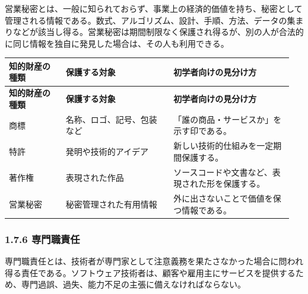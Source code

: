 \documentclass[uplatex,dvipdfmx,a4paper,11pt]{jsarticle}
\begin{document}
営業秘密とは、一般に知られておらず、事業上の経済的価値を持ち、秘密として管理される情報である。数式、アルゴリズム、設計、手順、方法、データの集まりなどが該当し得る。営業秘密は期間制限なく保護され得るが、別の人が合法的に同じ情報を独自に発見した場合は、その人も利用できる。

\begin{center}
\small
\begin{longtable}{p{0.19\linewidth}p{0.36\linewidth}p{0.40\linewidth}}
\toprule
\textbf{知的財産の種類} & \textbf{保護する対象} & \textbf{初学者向けの見分け方} \\
\midrule
\endfirsthead
\toprule
\textbf{知的財産の種類} & \textbf{保護する対象} & \textbf{初学者向けの見分け方} \\
\midrule
\endhead
商標 & 名称、ロゴ、記号、包装など & 「誰の商品・サービスか」を示す印である。 \\
\midrule
特許 & 発明や技術的アイデア & 新しい技術的仕組みを一定期間保護する。 \\
\midrule
著作権 & 表現された作品 & ソースコードや文書など、表現された形を保護する。 \\
\midrule
営業秘密 & 秘密管理された有用情報 & 外に出さないことで価値を保つ情報である。 \\
\midrule
\bottomrule
\end{longtable}
\normalsize
\end{center}

\begin{center}
\end{center}

\subsubsection*{1.7.6 専門職責任}


専門職責任とは、技術者が専門家として注意義務を果たさなかった場合に問われ得る責任である。ソフトウェア技術者は、顧客や雇用主にサービスを提供するため、専門過誤、過失、能力不足の主張に備えなければならない。
\end{document}
